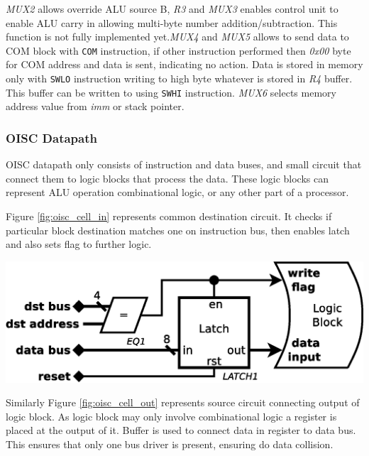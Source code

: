 \textit{MUX2} allows override ALU source B, \textit{R3} and \textit{MUX3} enables control unit to enable ALU carry in allowing multi-byte number addition/subtraction. This function is not fully implemented yet.\textit{MUX4} and \textit{MUX5} allows to send data to COM block with \texttt{COM} instruction, if other instruction performed then \textit{0x00} byte for COM address and data is sent, indicating no action. Data is stored in memory only with \texttt{SWLO} instruction writing to high byte whatever is stored in \textit{R4} buffer. This buffer can be written to using \texttt{SWHI} instruction. \textit{MUX6} selects memory address value from \textit{imm} or stack pointer.

\subsubsection{OISC Datapath} \label{subsec:oisc_cells}

OISC datapath only consists of instruction and data buses, and small circuit that connect them to logic blocks that process the data. These logic blocks can represent ALU operation combinational logic, or any other part of a processor.

Figure \ref{fig:oisc_cell_in} represents common destination circuit. It checks if particular block destination matches one on instruction bus, then enables latch and also sets flag to further logic. 
\begin{colfigure}
	\centering
	\includegraphics[width=\linewidth]{../resources/oisc_cell_in.eps}
	\label{fig:oisc_cell_in}
\end{colfigure}

Similarly Figure \ref{fig:oisc_cell_out} represents source circuit connecting output of logic block. As logic block may only involve combinational logic a register is placed at the output of it. Buffer is used to connect data in register to data bus. This ensures that only one bus driver is present, ensuring do data collision. 

